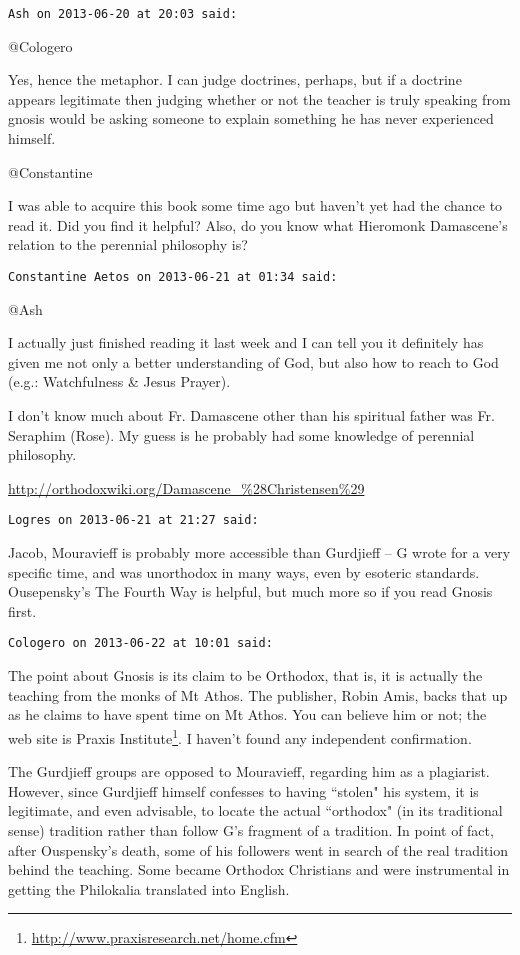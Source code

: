\begin{footnotesize}
\begin{sffamily}
\hfill

\texttt{Ash on 2013-06-20 at 20:03 said: }

@Cologero

Yes, hence the metaphor. I can judge doctrines, perhaps, but if a doctrine appears legitimate then judging whether or not the teacher is truly speaking from gnosis would be asking someone to explain something he has never experienced himself.

@Constantine

I was able to acquire this book some time ago but haven't yet had the chance to read it. Did you find it helpful? Also, do you know what Hieromonk Damascene's relation to the perennial philosophy is?


\hfill

\texttt{Constantine Aetos on 2013-06-21 at 01:34 said: }

@Ash

I actually just finished reading it last week and I can tell you it definitely has given me not only a better understanding of God, but also how to reach to God (e.g.: Watchfulness \& Jesus Prayer). 

I don't know much about Fr. Damascene other than his spiritual father was Fr. Seraphim (Rose). My guess is he probably had some knowledge of perennial philosophy. 

\url{http://orthodoxwiki.org/Damascene\_\%28Christensen\%29}


\hfill

\texttt{Logres on 2013-06-21 at 21:27 said: }

Jacob, Mouravieff is probably more accessible than Gurdjieff – G wrote for a very specific time, and was unorthodox in many ways, even by esoteric standards. Ousepensky's The Fourth Way is helpful, but much more so if you read Gnosis first.


\hfill

\texttt{Cologero on 2013-06-22 at 10:01 said: }

The point about Gnosis is its claim to be Orthodox, that is, it is actually the teaching from the monks of Mt Athos. The publisher, Robin Amis, backs that up as he claims to have spent time on Mt Athos. You can believe him or not; the web site is Praxis Institute\footnote{\url{http://www.praxisresearch.net/home.cfm}}. I haven't found any independent confirmation.

The Gurdjieff groups are opposed to Mouravieff, regarding him as a plagiarist. However, since Gurdjieff himself confesses to having ``stolen" his system, it is legitimate, and even advisable, to locate the actual ``orthodox" (in its traditional sense) tradition rather than follow G's fragment of a tradition. In point of fact, after Ouspensky's death, some of his followers went in search of the real tradition behind the teaching. Some became Orthodox Christians and were instrumental in getting the Philokalia translated into English.



\end{sffamily}
\end{footnotesize}
